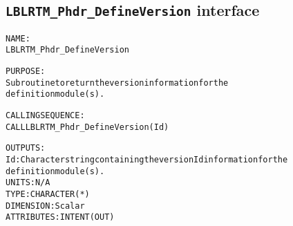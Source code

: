 \subsection{\texttt{LBLRTM\_Phdr\_DefineVersion} interface}
  \label{sec:LBLRTM_Phdr_DefineVersion_interface}
  \begin{alltt}
 
  NAME:
        LBLRTM_Phdr_DefineVersion
 
  PURPOSE:
        Subroutine to return the version information for the
        definition module(s).
 
  CALLING SEQUENCE:
        CALL LBLRTM_Phdr_DefineVersion( Id )
 
  OUTPUTS:
        Id:     Character string containing the version Id information for the
                definition module(s).
                UNITS:      N/A
                TYPE:       CHARACTER(*)
                DIMENSION:  Scalar
                ATTRIBUTES: INTENT(OUT)
 
  \end{alltt}
